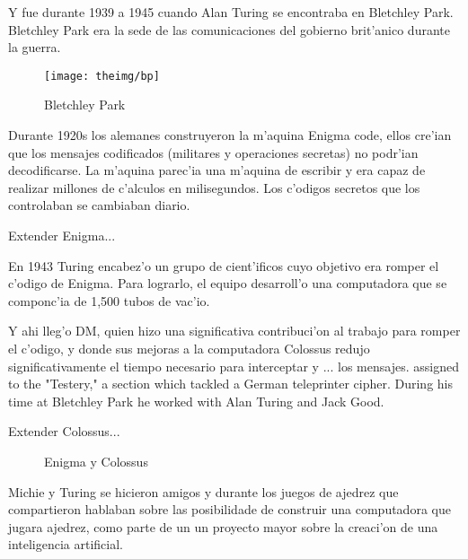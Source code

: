 \documentclass[11pt]{article}
\begin{document}
Y fue durante 1939 a 1945 cuando Alan Turing se encontraba en Bletchley Park. Bletchley Park era la sede de las comunicaciones del gobierno brit'anico durante la guerra. 

\begin{figure}[h]

\centering
\texttt{[image: theimg/bp]}

\caption[Bletchley Park]{Bletchley Park} 
\label{fig:bp}

\end{figure}

Durante 1920s los alemanes construyeron la m'aquina Enigma code, ellos cre'ian que los mensajes codificados (militares y operaciones secretas) no podr'ian decodificarse. La m'aquina parec'ia una m'aquina de escribir y era capaz de realizar millones de c'alculos en milisegundos. Los c'odigos secretos que los controlaban se cambiaban diario.

Extender Enigma...

En 1943 Turing encabez'o un grupo de cient'ificos cuyo objetivo era romper el c'odigo de Enigma. Para lograrlo, el equipo desarroll'o una computadora que se componc'ia de 1,500 tubos de vac'io.

Y ahi lleg'o DM, quien hizo una significativa contribuci'on al trabajo para romper el c'odigo, y donde sus mejoras a la computadora Colossus redujo significativamente el tiempo necesario para interceptar y ... los mensajes. assigned to the "Testery," a section which tackled a German teleprinter cipher. During his time at Bletchley Park he worked with Alan Turing and Jack Good.

Extender Colossus...

\begin{figure}[h]
\begin{center}

\caption{Enigma y Colossus}
  \label{fig:enigmacolossus}
\end{center}
\end{figure} 

Michie y Turing se hicieron amigos y durante los juegos de ajedrez que compartieron hablaban sobre las posibilidade de construir una computadora que jugara ajedrez, como parte de un un proyecto mayor sobre la creaci'on de una inteligencia artificial.
\end{document}
